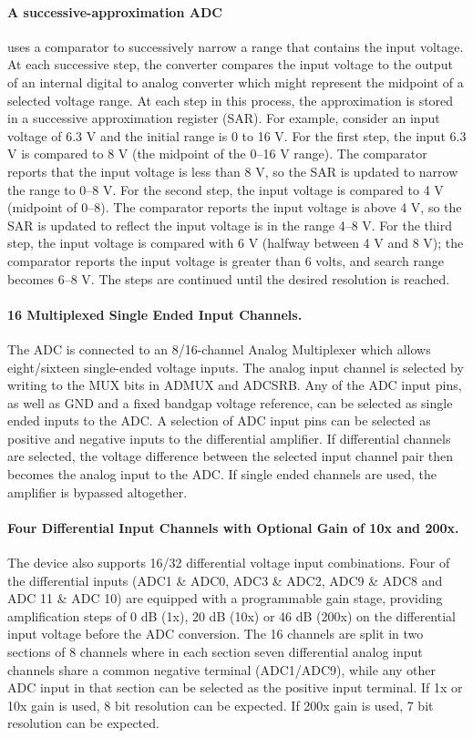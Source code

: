 \documentclass[english]{article}
\begin{document}
\paragraph{A successive-approximation ADC} uses a comparator to successively narrow a range that contains the input voltage. At each successive step, the converter compares the input voltage to the output of an internal digital to analog converter which might represent the midpoint of a selected voltage range. At each step in this process, the approximation is stored in a successive approximation register (SAR). For example, consider an input voltage of 6.3 V and the initial range is 0 to 16 V. For the first step, the input 6.3 V is compared to 8 V (the midpoint of the 0–16 V range). The comparator reports that the input voltage is less than 8 V, so the SAR is updated to narrow the range to 0–8 V. For the second step, the input voltage is compared to 4 V (midpoint of 0–8). The comparator reports the input voltage is above 4 V, so the SAR is updated to reflect the input voltage is in the range 4–8 V. For the third step, the input voltage is compared with 6 V (halfway between 4 V and 8 V); the comparator reports the input voltage is greater than 6 volts, and search range becomes 6–8 V. The steps are continued until the desired resolution is reached.
\paragraph{16 Multiplexed Single Ended Input Channels.} The ADC is connected to an 8/16-channel Analog Multiplexer which allows eight/sixteen single-ended voltage inputs. The analog input channel is selected by writing to the MUX bits in ADMUX and ADCSRB. Any of the ADC input pins, as well as GND and a fixed bandgap voltage reference, can be selected as single ended inputs to the ADC. A selection of ADC input pins can be selected as positive and negative inputs to the differential amplifier. If differential channels are selected, the voltage difference between the selected input channel pair then becomes the analog input to the ADC. If single ended channels are used, the amplifier is bypassed altogether.
\paragraph{Four Differential Input Channels with Optional Gain of 10x and 200x.} The device also supports 16/32 differential voltage input combinations. Four of the differential inputs (ADC1 \& ADC0, ADC3 \& ADC2, ADC9 \& ADC8 and ADC 11 \& ADC 10) are equipped with a programmable gain stage, providing amplification steps of 0 dB (1x), 20 dB (10x) or 46 dB (200x) on the differential input voltage before the ADC conversion. The 16 channels are split in two sections of 8 channels where in each section seven differential analog input channels share a common negative terminal (ADC1/ADC9), while any other ADC input in that section can be selected as the positive input terminal. If 1x or 10x gain is used, 8 bit resolution can be expected. If 200x gain is used, 7 bit resolution can be expected.
\end{document}
